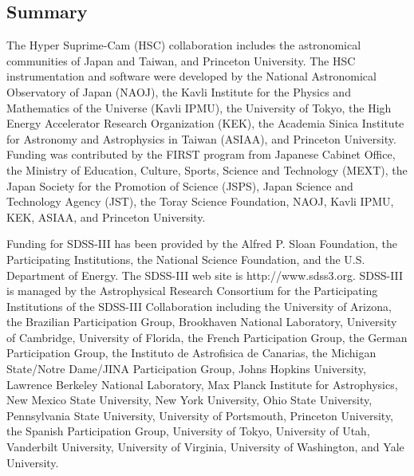 \documentclass[preprint]{aastex}
\begin{document}
\begin{CJK*}{UTF8}{gbsn}

\section{Summary}

   
  
\acknowledgements
  
  The Hyper Suprime-Cam (HSC) collaboration includes the astronomical communities of Japan
  and Taiwan, and Princeton University.  The HSC instrumentation and software were
  developed by the National Astronomical Observatory of Japan (NAOJ), the Kavli Institute
  for the Physics and Mathematics of the Universe (Kavli IPMU), the University of Tokyo,
  the High Energy Accelerator Research Organization (KEK), the Academia Sinica Institute
  for Astronomy and Astrophysics in Taiwan (ASIAA), and Princeton University.  Funding was
  contributed by the FIRST program from Japanese Cabinet Office, the Ministry of
  Education, Culture, Sports, Science and Technology (MEXT), the Japan Society for the
  Promotion of Science (JSPS),  Japan Science and Technology Agency (JST),  the Toray
  Science  Foundation, NAOJ, Kavli IPMU, KEK, ASIAA,  and Princeton University.
   
  Funding for SDSS-III has been provided by the Alfred P. Sloan Foundation, the
  Participating Institutions, the National Science Foundation, and the U.S.  Department of
  Energy. The SDSS-III web site is http://www.sdss3.org.  SDSS-III is managed by the
  Astrophysical Research Consortium for the Participating Institutions of the SDSS-III
  Collaboration including the University of Arizona, the Brazilian Participation Group,
  Brookhaven National Laboratory, University of Cambridge, University of Florida, the
  French Participation Group, the German Participation Group, the Instituto de Astrofisica
  de Canarias, the Michigan State/Notre Dame/JINA Participation Group, Johns Hopkins
  University, Lawrence Berkeley National Laboratory, Max Planck Institute for
  Astrophysics, New Mexico State University, New York University, Ohio State University,
  Pennsylvania State University, University of Portsmouth, Princeton University, the
  Spanish Participation Group, University of Tokyo, University of Utah, Vanderbilt
  University, University of Virginia, University of Washington, and Yale University.
  

\end{CJK*}
\end{document}
